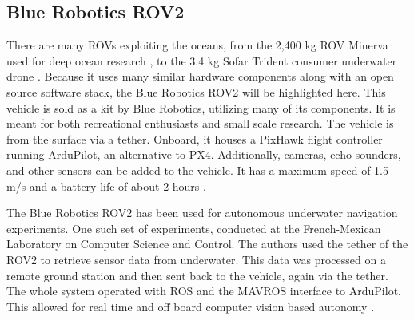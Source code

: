 \subsection{Blue Robotics ROV2}
There are many ROVs exploiting the oceans, from the 2,400 kg ROV Minerva used for deep ocean research \parencite{minerva}, to the 3.4 kg Sofar Trident consumer underwater drone \parencite{sofar}. Because it uses many similar hardware components along with an open source software stack, the Blue Robotics ROV2 will be highlighted here. This vehicle is sold as a kit by Blue Robotics, utilizing many of its components. It is meant for both recreational enthusiasts and small scale research. The vehicle is from the surface via a tether. Onboard, it houses a PixHawk flight controller running ArduPilot, an alternative to PX4. Additionally, cameras, echo sounders, and other sensors can be added to the vehicle. It has a maximum speed of 1.5 m/s and a battery life of about 2 hours \parencite{bluerov}.

The Blue Robotics ROV2 has been used for autonomous underwater navigation experiments. One such set of experiments, conducted at the French-Mexican Laboratory on Computer Science and Control. The authors used the tether of the ROV2 to retrieve sensor data from underwater. This data was processed on a remote ground station and then sent back to the vehicle, again via the tether. The whole system operated with ROS and the MAVROS interface to ArduPilot. This allowed for real time and off board computer vision based autonomy \parencite{rtcv}.
